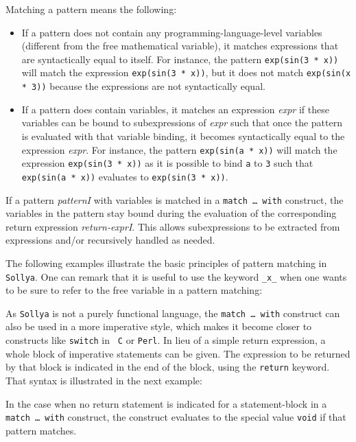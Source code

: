 \documentclass[a4paper]{article}
\newcommand{\key}[1]{\texttt{#1}}
\newcommand{\sollya}{\texttt{Sollya}\xspace}
\begin{document}
Matching a pattern means the following: 
\begin{itemize}
  \item If a pattern does not contain any programming-language-level
    variables (different from the free mathematical variable), it
    matches expressions that are syntactically equal to itself. For
    instance, the pattern \key{exp(sin(3 * x))} will match the
    expression \key{exp(sin(3 * x))}, but it does not match \key{exp(sin(x * 3))} because the expressions are not syntactically equal.
  \item If a pattern does contain variables, it matches an expression
    {\it expr} if these variables can be bound to subexpressions of
    {\it expr} such that once the pattern is evaluated with that
    variable binding, it becomes syntactically equal to the expression
    {\it expr}. For instance, the pattern \key{exp(sin(a * x))} will
    match the expression \key{exp(sin(3 * x))} as it is possible to
    bind \key{a} to \key{3} such that \key{exp(sin(a~*~x))} evaluates
    to \key{exp(sin(3~*~x))}.
\end{itemize}

If a pattern {\it patternI} with variables is matched in a \key{match
  \dots~with} construct, the variables in the pattern stay bound
during the evaluation of the corresponding return expression {\it
  return-exprI}. This allows subexpressions to be extracted from
expressions and/or recursively handled as needed.

The following examples illustrate the basic principles of pattern
matching in \sollya. One can remark that it is useful to use the
keyword \verb|_x_| when one wants to be sure to refer to the free
variable in a pattern matching:



As \sollya is not a purely functional language, the \key{match
  \dots~with} construct can also be used in a more imperative style,
which makes it become closer to constructs like \key{switch} in {\tt
  C} or {\tt Perl}. In lieu of a simple return expression, a whole
block of imperative statements can be given. The expression to be
returned by that block is indicated in the end of the block, using
the \key{return} keyword. That syntax is illustrated in the next
example:



In the case when no return statement is indicated for a
statement-block in a \key{match \dots~with} construct, the construct
evaluates to the special value \key{void} if that pattern matches.
\end{document}
